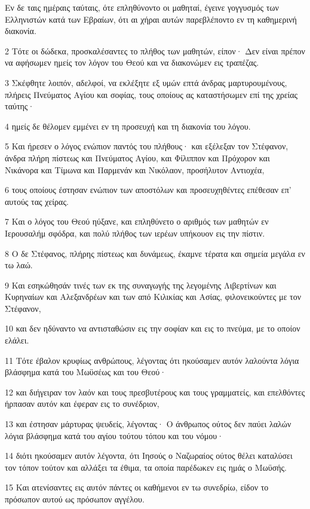 \par Εν δε ταις ημέραις ταύταις, ότε επληθύνοντο οι μαθηταί, έγεινε γογγυσμός των Ελληνιστών κατά των Εβραίων, ότι αι χήραι αυτών παρεβλέποντο εν τη καθημερινή διακονία.
\par 2 Τότε οι δώδεκα, προσκαλέσαντες το πλήθος των μαθητών, είπον· Δεν είναι πρέπον να αφήσωμεν ημείς τον λόγον του Θεού και να διακονώμεν εις τραπέζας.
\par 3 Σκέφθητε λοιπόν, αδελφοί, να εκλέξητε εξ υμών επτά άνδρας μαρτυρουμένους, πλήρεις Πνεύματος Αγίου και σοφίας, τους οποίους ας καταστήσωμεν επί της χρείας ταύτης·
\par 4 ημείς δε θέλομεν εμμένει εν τη προσευχή και τη διακονία του λόγου.
\par 5 Και ήρεσεν ο λόγος ενώπιον παντός του πλήθους· και εξέλεξαν τον Στέφανον, άνδρα πλήρη πίστεως και Πνεύματος Αγίου, και Φίλιππον και Πρόχορον και Νικάνορα και Τίμωνα και Παρμενάν και Νικόλαον, προσήλυτον Αντιοχέα,
\par 6 τους οποίους έστησαν ενώπιον των αποστόλων και προσευχηθέντες επέθεσαν επ' αυτούς τας χείρας.
\par 7 Και ο λόγος του Θεού ηύξανε, και επληθύνετο ο αριθμός των μαθητών εν Ιερουσαλήμ σφόδρα, και πολύ πλήθος των ιερέων υπήκουον εις την πίστιν.
\par 8 Ο δε Στέφανος, πλήρης πίστεως και δυνάμεως, έκαμνε τέρατα και σημεία μεγάλα εν τω λαώ.
\par 9 Και εσηκώθησάν τινές των εκ της συναγωγής της λεγομένης Λιβερτίνων και Κυρηναίων και Αλεξανδρέων και των από Κιλικίας και Ασίας, φιλονεικούντες με τον Στέφανον,
\par 10 και δεν ηδύναντο να αντισταθώσιν εις την σοφίαν και εις το πνεύμα, με το οποίον ελάλει.
\par 11 Τότε έβαλον κρυφίως ανθρώπους, λέγοντας ότι ηκούσαμεν αυτόν λαλούντα λόγια βλάσφημα κατά του Μωϋσέως και του Θεού·
\par 12 και διήγειραν τον λαόν και τους πρεσβυτέρους και τους γραμματείς, και επελθόντες ήρπασαν αυτόν και έφεραν εις το συνέδριον,
\par 13 και έστησαν μάρτυρας ψευδείς, λέγοντας· Ο άνθρωπος ούτος δεν παύει λαλών λόγια βλάσφημα κατά του αγίου τούτου τόπου και του νόμου·
\par 14 διότι ηκούσαμεν αυτόν λέγοντα, ότι Ιησούς ο Ναζωραίος ούτος θέλει καταλύσει τον τόπον τούτον και αλλάξει τα έθιμα, τα οποία παρέδωκεν εις ημάς ο Μωϋσής.
\par 15 Και ατενίσαντες εις αυτόν πάντες οι καθήμενοι εν τω συνεδρίω, είδον το πρόσωπον αυτού ως πρόσωπον αγγέλου.

